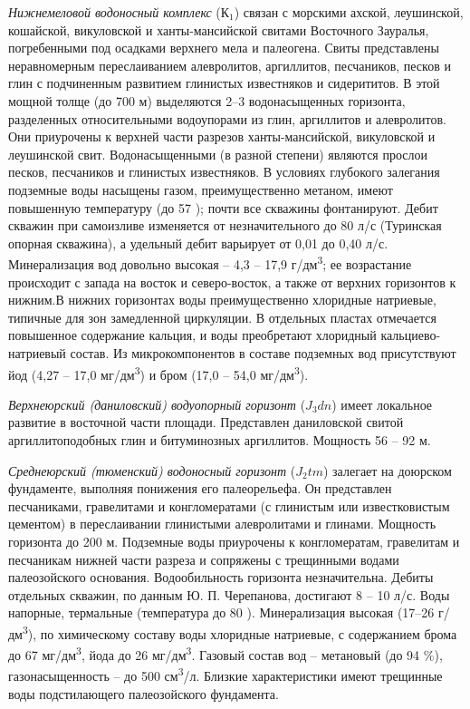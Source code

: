 \documentclass[a4paper,12pt]{article} %
\begin{document}
\textit{Нижнемеловой водоносный комплекс} ($К_1$) связан с морскими ахской, леушинской, кошайской, викуловской и ханты-мансийской свитами Восточного Зауралья, погребенными под осадками верхнего мела и палеогена.
Свиты представлены неравномерным переслаиванием алевролитов, аргиллитов, песчаников, песков и глин с подчиненным развитием глинистых известняков и сидерититов. В этой мощной толще (до 700 м) выделяются
2–3 водонасыщенных горизонта, разделенных относительными водоупорами из глин, аргиллитов и алевролитов. Они приурочены к верхней части разрезов ханты-мансийской, викуловской и леушинской свит. Водонасыщенными (в разной степени) являются прослои песков, песчаников и глинистых известняков. В условиях глубокого залегания подземные воды насыщены газом, преимущественно метаном, имеют повышенную температуру (до 57 ); почти все скважины фонтанируют. Дебит скважин при самоизливе изменяется от незначительного до 80 л/с (Туринская опорная скважина), а удельный дебит варьирует от 0,01 до 0,40 л/с. Минерализация
вод довольно высокая – 4,3 – 17,9 г/дм\textsuperscript{3}; ее возрастание происходит с запада на восток и северо-восток, а также от верхних горизонтов к нижним.В нижних горизонтах воды преимущественно хлоридные натриевые, типичные для зон замедленной циркуляции. В отдельных пластах отмечается повышенное содержание кальция, и воды преобретают хлоридный кальциево-натриевый состав. Из микрокомпонентов в составе подземных вод присутствуют йод (4,27 – 17,0 мг/дм\textsuperscript{3}) и бром (17,0 – 54,0 мг/дм\textsuperscript{3}).

\textit{Верхнеюрский (даниловский) водуопорный горизонт} ($J_3dn$) имеет локальное
развитие в восточной части площади. Представлен даниловской свитой аргиллитоподобных глин и битуминозных аргиллитов. Мощность 56 – 92 м.

\textit{Среднеюрский (тюменский) водоносный горизонт} ($J_2tm$) залегает на доюрском фундаменте, выполняя понижения его палеорельефа. Он представлен песчаниками, гравелитами и конгломератами (с глинистым или известковистым цементом) в переслаивании глинистыми алевролитами и глинами. Мощность горизонта до 200 м. Подземные воды приурочены к конгломератам, гравелитам и песчаникам нижней части разреза и сопряжены с трещинными водами палеозойского основания. Водообильность горизонта незначительна. Дебиты отдельных скважин, по данным Ю. П. Черепанова, достигают 8 – 10 л/с. Воды напорные, термальные (температура до 80 ). Минерализация высокая (17–26 г/дм\textsuperscript{3}), по химическому составу воды хлоридные натриевые, с содержанием брома до 67 мг/дм\textsuperscript{3}, йода до 26 мг/дм\textsuperscript{3}. Газовый состав вод – метановый (до 94 \%), газонасыщенность – до 500 см\textsuperscript{3}/л. Близкие характеристики имеют трещинные воды подстилающего палеозойского фундамента.
\end{document}
